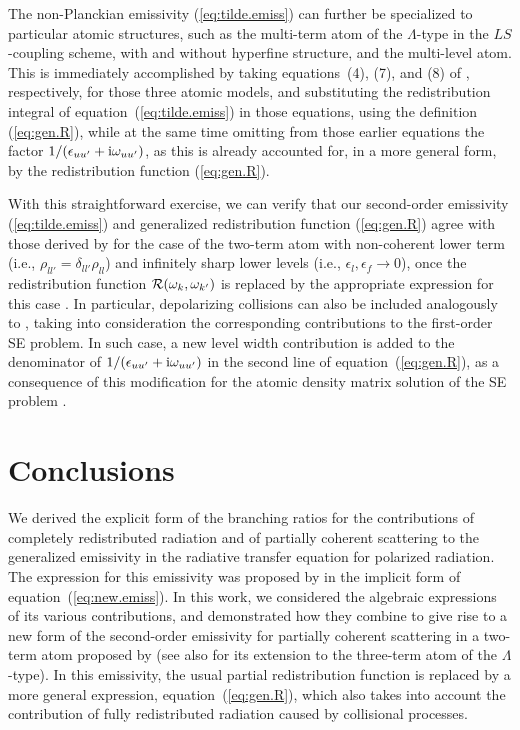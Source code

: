 \documentclass[preprint]{aastex}
\newcommand{\<}{{\kern-5pt}}
\begin{document}
The non-Planckian emissivity (\ref{eq:tilde.emiss}) can further be specialized 
to particular atomic structures, such as the multi-term atom of the
$\Lambda$-type in the $LS$-coupling scheme, with and without hyperfine 
structure, and the multi-level atom. This is immediately accomplished by
taking 
equations~(4), (7), and (8) of \cite{CM16}, respectively, for those
three atomic models, and substituting the redistribution integral of 
equation~(\ref{eq:tilde.emiss}) in those equations, using the definition
(\ref{eq:gen.R}), while at the same time omitting from those earlier
equations the factor $1/(\epsilon_{uu'}+{\rm i}\omega_{uu'})$, as this
is already accounted for, in a more general form, by the
redistribution function (\ref{eq:gen.R}).

With this straightforward exercise, we can verify that our second-order
emissivity (\ref{eq:tilde.emiss}) and generalized redistribution function 
(\ref{eq:gen.R}) agree with those derived by \cite{Bo17} for the case of 
the two-term atom with non-coherent lower term (i.e., 
$\rho_{ll'}=\delta_{ll'}\rho_{ll}$) and infinitely sharp
lower levels (i.e., $\epsilon_l,\epsilon_f\to 0$), once the
redistribution function ${\cal R}(\omega_k,\omega_{k'})$ is replaced by 
the appropriate expression for this case \cite[][equation~(10)]{Ca14}.
%
In particular, depolarizing collisions can also be included analogously to
\cite{Bo17}, taking into consideration the corresponding contributions
to the first-order SE problem. In such case, a new level width contribution 
is added to the denominator of $1/(\epsilon_{uu'}+{\rm i}\omega_{uu'})$ 
in the second line of equation~(\ref{eq:gen.R}), 
as a consequence of this modification for the 
atomic density matrix solution of the SE problem \cite[see][]{Bo17}.

\section{Conclusions}

We derived the explicit form of the branching ratios for the
contributions of completely redistributed radiation and of partially
coherent scattering to the generalized emissivity in the radiative
transfer equation for polarized radiation. The expression for this 
emissivity was proposed by \cite{Ca17} in the implicit form of
equation~(\ref{eq:new.emiss}). In this work, we considered the 
algebraic expressions of its various contributions, and 
demonstrated how they combine to give rise to a new form of the 
second-order emissivity for partially coherent scattering in a two-term
atom proposed by \cite{Ca14} (see also \citealt{CM16} for its extension
to the three-term atom of the $\Lambda$-type). In this emissivity, 
the usual partial redistribution function is replaced by a more general 
expression, equation~(\ref{eq:gen.R}), which also takes into account 
the contribution of fully redistributed radiation caused by 
collisional processes.
\end{document}
